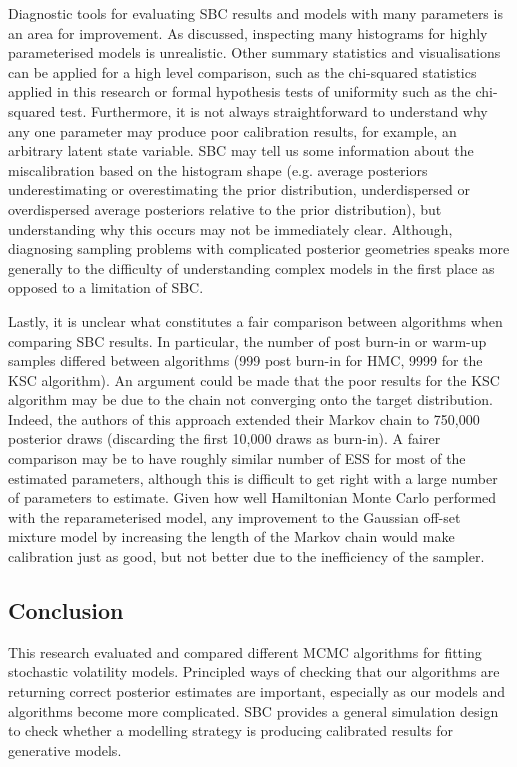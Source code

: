 \documentclass[12pt, a4paper]{article}
\begin{document}
Diagnostic tools for evaluating SBC results and models with many parameters is an area for improvement. As discussed, inspecting many histograms for highly parameterised models is unrealistic. Other summary statistics and visualisations can be applied for a high level comparison, such as the chi-squared statistics applied in this research or formal hypothesis tests of uniformity such as the chi-squared test. Furthermore, it is not always straightforward to understand why any one parameter may produce poor calibration results, for example, an arbitrary latent state variable. SBC may tell us some information about the miscalibration based on the histogram shape (e.g. average posteriors underestimating or overestimating the prior distribution, underdispersed or overdispersed average posteriors relative to the prior distribution), but understanding why this occurs may not be immediately clear. Although, diagnosing sampling problems with complicated posterior geometries speaks more generally to the difficulty of understanding complex models in the first place as opposed to a limitation of SBC.

Lastly, it is unclear what constitutes a fair comparison between algorithms when comparing SBC results. In particular, the number of post burn-in or warm-up samples differed between algorithms (999 post burn-in for HMC, 9999 for the KSC algorithm). An argument could be made that the poor results for the KSC algorithm may be due to the chain not converging onto the target distribution. Indeed, the authors of this approach extended their Markov chain to 750,000 posterior draws (discarding the first 10,000 draws as burn-in). A fairer comparison may be to have roughly similar number of ESS for most of the estimated parameters, although this is difficult to get right with a large number of parameters to estimate. Given how well Hamiltonian Monte Carlo performed with the reparameterised model, any improvement to the Gaussian off-set mixture model by increasing the length of the Markov chain would make calibration just as good, but not better due to the inefficiency of the sampler. 

\subsection{Conclusion}
This research evaluated and compared different MCMC algorithms for fitting stochastic volatility models. Principled ways of checking that our algorithms are returning correct posterior estimates are important, especially as our models and algorithms become more complicated. SBC provides a general simulation design to check whether a modelling strategy is producing calibrated results for generative models.
\end{document}

